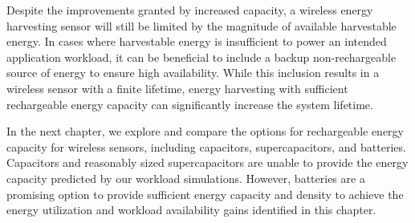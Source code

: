 Despite the improvements granted by increased capacity, a wireless energy harvesting sensor will still be limited by the magnitude of available harvestable energy.
In cases where harvestable energy is insufficient to power an intended application workload, it can be beneficial to include a backup non-rechargeable source of energy to ensure high availability.
While this inclusion results in a wireless sensor with a finite lifetime, energy harvesting with sufficient rechargeable energy capacity can significantly increase the system lifetime.

In the next chapter, we explore and compare the options for rechargeable energy capacity for wireless sensors, including capacitors, supercapacitors, and batteries. 
Capacitors and reasonably sized supercapacitors are unable to provide the energy capacity predicted by our workload simulations. 
However, batteries are a promising option to provide sufficient energy capacity and density to achieve the energy utilization and workload availability gains identified in this chapter.




